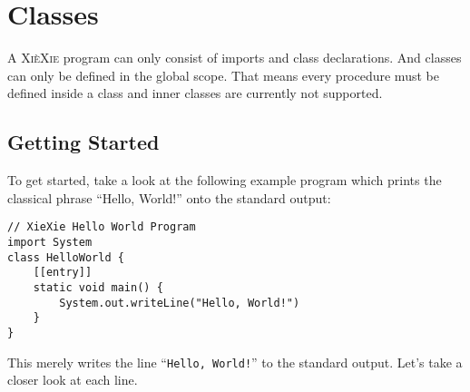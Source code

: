 \documentclass{report}
\def\xiexie{\textsc{Xi\`eXie}\xspace}
\begin{document}

\chapter{Classes}
\label{ch:classes}

A \xiexie program can only consist of imports and class declarations. And classes can only be defined in the global scope.
That means every procedure must be defined inside a class and inner classes are currently not supported.



\section{Getting Started}

To get started, take a look at the following example program which prints the classical phrase ``Hello, World!''
onto the standard output:
\begin{lstlisting}
// XieXie Hello World Program
import System
class HelloWorld {
    [[entry]]
    static void main() {
        System.out.writeLine("Hello, World!")
    }
}
\end{lstlisting}
This merely writes the line ``\texttt{Hello, World!}'' to the standard output. Let's take a closer look at each line.
\end{document}
